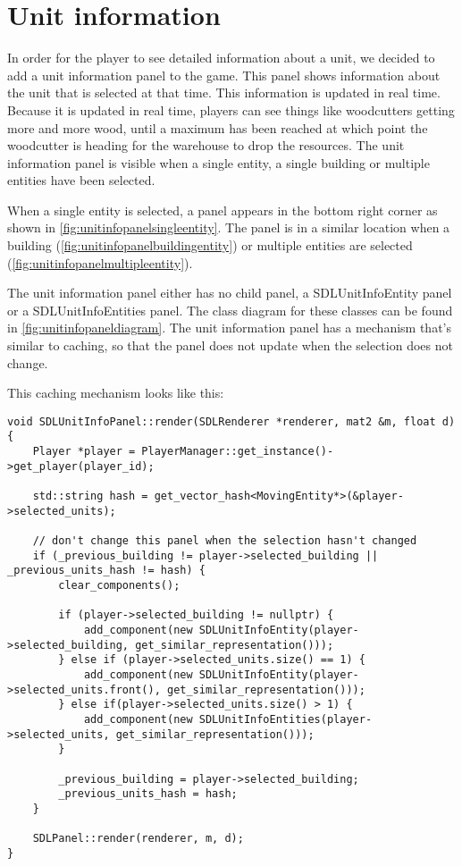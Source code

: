 \section{Unit information}

In order for the player to see detailed information about a unit, we decided to
add a unit information panel to the game. This panel shows information about
the unit that is selected at that time. This information is updated in real
time. Because it is updated in real time, players can see things like
woodcutters getting more and more wood, until a maximum has been reached at
which point the woodcutter is heading for the warehouse to drop the resources.
The unit information panel is visible when a single entity, a single building
or multiple entities have been selected.

When a single entity is selected, a panel appears in the bottom right corner as
shown in \cref{fig:unitinfopanelsingleentity}. The panel is in a similar
location when a building (\cref{fig:unitinfopanelbuildingentity}) or multiple
entities are selected (\cref{fig:unitinfopanelmultipleentity}).

The unit information panel either has no child panel, a SDLUnitInfoEntity panel
or a SDLUnitInfoEntities panel. The class diagram for these classes can be
found in \cref{fig:unitinfopaneldiagram}. The unit information panel has a
mechanism that's similar to caching, so that the panel does not update when the
selection does not change.

This caching mechanism looks like this:

\begin{lstlisting}[caption={Unit information panel}] 
void SDLUnitInfoPanel::render(SDLRenderer *renderer, mat2 &m, float d) { 
    Player *player = PlayerManager::get_instance()->get_player(player_id);

    std::string hash = get_vector_hash<MovingEntity*>(&player->selected_units);

    // don't change this panel when the selection hasn't changed 
    if (_previous_building != player->selected_building || _previous_units_hash != hash) { 
        clear_components();

        if (player->selected_building != nullptr) { 
            add_component(new SDLUnitInfoEntity(player->selected_building, get_similar_representation())); 
        } else if (player->selected_units.size() == 1) { 
            add_component(new SDLUnitInfoEntity(player->selected_units.front(), get_similar_representation())); 
        } else if(player->selected_units.size() > 1) { 
            add_component(new SDLUnitInfoEntities(player->selected_units, get_similar_representation())); 
        }

        _previous_building = player->selected_building; 
        _previous_units_hash = hash; 
    }

    SDLPanel::render(renderer, m, d); 
} 
\end{lstlisting}

